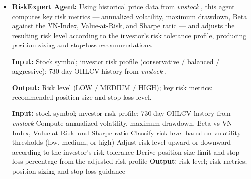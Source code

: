 \documentclass{ieeeaccess}
\begin{document}
\begin{itemize}
    \textbf{Input:} Stock symbol; financial ratios (P/E, P/B, EPS, dividend yield) and 730-day
    OHLCV data from \textit{vnstock} \cite{vnstock2023}.

    \textbf{Output:} Investment recommendation (BUY/HOLD/SELL); composite score (0--100);
    confidence level; per-dimension analysis breakdown.

    \begin{algorithmic}[1]
    \STATE \textbf{Input:} stock symbol; financial ratios and OHLCV history from \textit{vnstock}
    \STATE Fetch P/E, P/B, EPS, dividend yield, 52-week high/low, volume, and Beta
    \STATE Score each metric independently on a 0--100 scale based on predefined thresholds
    \STATE Combine scores with higher priority on financial health, followed equally by technical position and valuation
    \STATE Map composite score to recommendation: high scores yield BUY, low scores yield SELL, mid-range yields HOLD
    \STATE \textbf{Output:} recommendation; composite score; confidence level
    \end{algorithmic}


    \item \textbf{RiskExpert Agent:}
    Using historical price data from \textit{vnstock} \cite{vnstock2023}, this agent computes
    key risk metrics — annualized volatility, maximum drawdown, Beta against the VN-Index,
    Value-at-Risk, and Sharpe ratio — and adjusts the resulting risk level according to the
    investor's risk tolerance profile, producing position sizing and stop-loss recommendations.
    
    \textbf{Input:} Stock symbol; investor risk profile (conservative / balanced / aggressive);
    730-day OHLCV history from \textit{vnstock} \cite{vnstock2023}.

    \textbf{Output:} Risk level (LOW / MEDIUM / HIGH); key risk metrics; recommended position
    size and stop-loss level.

    \begin{algorithmic}[1]
    \STATE \textbf{Input:} stock symbol; investor risk profile; 730-day OHLCV history from \textit{vnstock}
    \STATE Compute annualized volatility, maximum drawdown, Beta vs VN-Index, Value-at-Risk, and Sharpe ratio
    \STATE Classify risk level based on volatility thresholds (low, medium, or high)
    \STATE Adjust risk level upward or downward according to the investor's risk tolerance
    \STATE Derive position size limit and stop-loss percentage from the adjusted risk profile
    \STATE \textbf{Output:} risk level; risk metrics; position sizing and stop-loss guidance
    \end{algorithmic}



\end{itemize}
\end{document}
